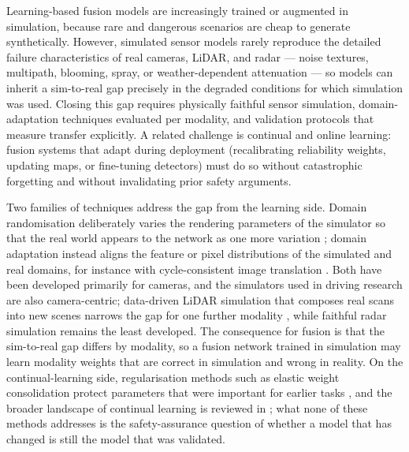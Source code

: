 \documentclass[graybox,envcountchap]{style/SNmono}
\begin{document}
Learning-based fusion models are increasingly trained or augmented in simulation, because rare and dangerous scenarios are cheap to generate synthetically. However, simulated sensor models rarely reproduce the detailed failure characteristics of real cameras, LiDAR, and radar --- noise textures, multipath, blooming, spray, or weather-dependent attenuation --- so models can inherit a sim-to-real gap precisely in the degraded conditions for which simulation was used. Closing this gap requires physically faithful sensor simulation, domain-adaptation techniques evaluated per modality, and validation protocols that measure transfer explicitly. A related challenge is continual and online learning: fusion systems that adapt during deployment (recalibrating reliability weights, updating maps, or fine-tuning detectors) must do so without catastrophic forgetting and without invalidating prior safety arguments.

Two families of techniques address the gap from the learning side. Domain randomisation deliberately varies the rendering parameters of the simulator so that the real world appears to the network as one more variation \cite{tobin2017_domain_randomization}; domain adaptation instead aligns the feature or pixel distributions of the simulated and real domains, for instance with cycle-consistent image translation \cite{hoffman2018_cycada}. Both have been developed primarily for cameras, and the simulators used in driving research \cite{dosovitskiy_carla_2017,shah_airsim_2017} are also camera-centric; data-driven LiDAR simulation that composes real scans into new scenes narrows the gap for one further modality \cite{manivasagam2020_lidarsim}, while faithful radar simulation remains the least developed. The consequence for fusion is that the sim-to-real gap differs by modality, so a fusion network trained in simulation may learn modality weights that are correct in simulation and wrong in reality. On the continual-learning side, regularisation methods such as elastic weight consolidation protect parameters that were important for earlier tasks \cite{kirkpatrick2017_ewc}, and the broader landscape of continual learning is reviewed in \cite{parisi2019_continual}; what none of these methods addresses is the safety-assurance question of whether a model that has changed is still the model that was validated.
\end{document}

